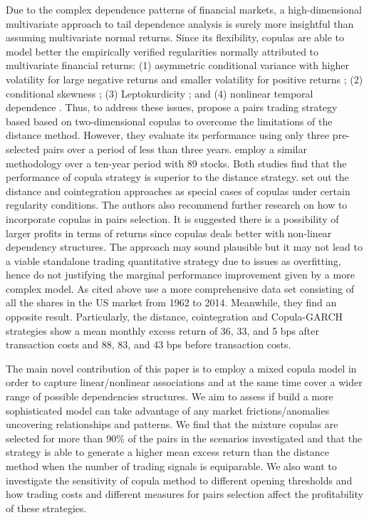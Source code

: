 \documentclass[a4paper,12pt]{report}
\begin{document}
	Due to the complex dependence patterns of financial markets, a high-dimensional multivariate approach to tail dependence analysis is surely more insightful than assuming multivariate normal returns. Since its flexibility, copulas are able to model better the empirically verified regularities normally attributed to multivariate financial returns: (1) asymmetric conditional variance with higher volatility for large negative returns and smaller volatility for positive returns \citep{h98}; (2) conditional skewness \citep{ait01,chen01,patton01}; (3) Leptokurdicity \citep{t01,andreou01}; and (4) nonlinear temporal dependence \citep{cont01,campbell97}. Thus, to address these issues, \citet*{lw2013} propose a pairs trading strategy based based on two-dimensional copulas to overcome the limitations of the distance method. However, they evaluate its performance using only three pre-selected pairs over a period of less than three years. \citet*{xie14} employ a similar methodology over a ten-year period with 89 stocks. Both studies find that the performance of copula strategy is superior to the distance strategy. \citet*{xw13} set out the distance and cointegration approaches as special cases of copulas under certain regularity conditions. The authors also recommend further research on how to incorporate copulas in pairs selection. It is suggested there is a possibility of larger profits in terms of returns since copulas deals better with non-linear dependency structures. The approach may sound plausible but it may not lead to a viable standalone trading quantitative strategy due to issues as overfitting, hence do not justifying the marginal performance improvement given by a more complex model. As cited above \citet*{rf15} use a more comprehensive data set consisting of all the shares in the US market from 1962 to 2014. Meanwhile, they find an opposite result. Particularly, the distance, cointegration and Copula-GARCH strategies show a mean monthly excess return of 36, 33, and 5 bps after transaction costs and 88, 83, and 43 bps before transaction costs.
	
	The main novel contribution of this paper is to employ a mixed copula model in order to capture linear/nonlinear associations and at the same time cover a wider range of possible dependencies structures. We aim to assess if build a more sophisticated model can take advantage of any market frictions/anomalies uncovering relationships and patterns. We find that the mixture copulas are selected for more than 90\% of the pairs in the scenarios investigated and that the strategy is able 
	to generate a higher mean excess return than the distance method when the 
	number of trading signals is equiparable. We also want to investigate the sensitivity of copula method to different opening thresholds and how trading costs and different measures for pairs selection affect the profitability of these strategies.
	
\end{document}
